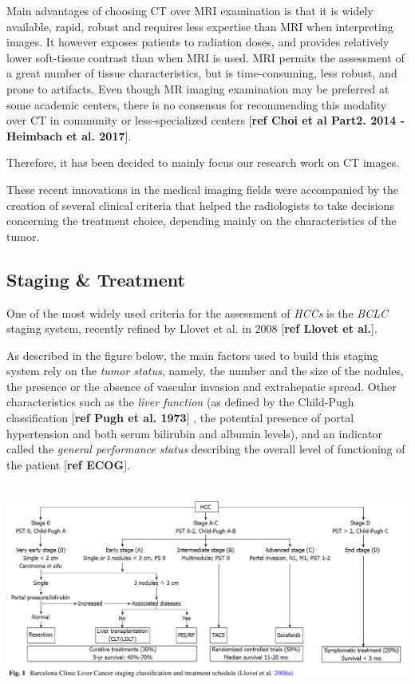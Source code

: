 \documentclass[]{article}
\begin{document}
Main advantages of choosing CT over MRI examination is that it is widely
available, rapid, robust and requires less expertise than MRI when
interpreting images. It however exposes patients to radiation doses, and
provides relatively lower soft-tissue contrast than when MRI is used.
MRI permits the assessment of a great number of tissue characteristics,
but is time-consuming, less robust, and prone to artifacts. Even though
MR imaging examination may be preferred at some academic centers, there
is no consensus for recommending this modality over CT in community or
less-specialized centers {[}\textbf{ref Choi et al Part2. 2014 -
Heimbach et al. 2017}{]}.

Therefore, it has been decided to mainly focus our research work on CT
images.

These recent innovations in the medical imaging fields were accompanied
by the creation of several clinical criteria that helped the
radiologists to take decisions concerning the treatment choice,
depending mainly on the characteristics of the tumor.

\subsection{Staging \& Treatment}\label{staging-treatment}

One of the most widely used criteria for the assessment of \emph{HCCs}
is the \emph{BCLC} staging system, recently refined by Llovet et al. in
2008 {[}\textbf{ref Llovet et al.}{]}.

As described in the figure below, the main factors used to build this
staging system rely on the \emph{tumor status}, namely, the number and
the size of the nodules, the presence or the absence of vascular
invasion and extrahepatic spread. Other characteristics such as the
\emph{liver function} (as defined by the Child-Pugh classification
{[}\textbf{ref Pugh et al. 1973}{]} , the potential presence of portal
hypertension and both serum bilirubin and albumin levels), and an
indicator called the \emph{general performance status} describing the
overall level of functioning of the patient {[}\textbf{ref ECOG}{]}.

\includegraphics[width=6.26772in,height=2.75000in]{./images/media/image5.png}
\end{document}
